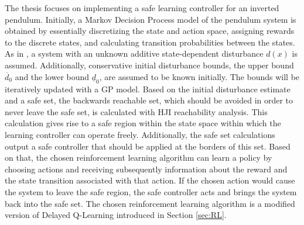 \documentclass[../main.tex]{subfiles}
\begin{document}
The thesis focuses on implementing a safe learning controller for an inverted pendulum. Initially, a Markov Decision Process model of the pendulum system is obtained by essentially discretizing the state and action space, assigning rewards to the discrete states, and calculating transition probabilities between the states. As in \cite{akametalu2014reachability}, a system with an unknown additive state-dependent disturbance $d(x)$ is assumed. Additionally, conservative initial disturbance bounds, the upper bound $\overline{d}_0$ and the lower bound $\underline{d}_0$, are assumed to be known initially. The bounds will be iteratively updated with a GP model. Based on the initial disturbance estimate and a safe set, the backwards reachable set, which should be avoided in order to never leave the safe set, is calculated with HJI reachability analysis. This calculation gives rise to a safe region within the state space within which the learning controller can operate freely. Additionally, the safe set calculations output a safe controller that should be applied at the borders of this set. Based on that, the chosen reinforcement learning algorithm can learn a policy by choosing actions and receiving subsequently information about the reward and the state transition associated with that action. If the chosen action would cause the system to leave the safe region, the safe controller acts and brings the system back into the safe set. The chosen reinforcement learning algorithm is a modified version of Delayed Q-Learning introduced in Section \ref{sec:RL}.
\end{document}
